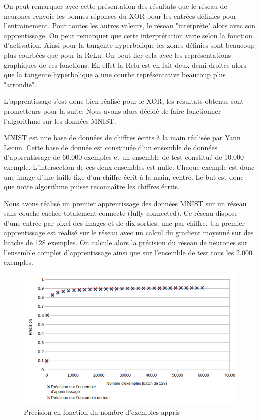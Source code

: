 \documentclass{report}
\theoremstyle{plain}
\theoremstyle{definition}
\theoremstyle{remark}
\begin{document}
On peut remarquer avec cette présentation des résultats que le réseau de neurones renvoie les bonnes réponses du XOR pour les entrées définies pour l'entrainement. Pour toutes les autres valeurs,  le réseau "interprète" alors avec son apprentissage. On peut remarquer que cette interprétation varie selon la fonction d'activation. Ainsi pour la tangente hyperbolique les zones définies sont beaucoup plus courbées que pour la ReLu. On peut lier cela avec les représentations graphiques de ces fonctions. En effet la Relu est en fait deux demi-droites alors que la tangente hyperbolique a une courbe représentative beaucoup plus "arrondie".

L'apprentissage s'est donc bien réalisé pour le XOR, les résultats obtenus sont prometteurs pour la suite. Nous avons alors décidé de faire fonctionner l'algorithme sur les données MNIST.

MNIST est une base de données de chiffres écrits à la main réalisée par Yann Lecun. Cette base de donnée est constituée d'un ensemble de données d'apprentissage de 60.000 exemples et un ensemble de test constitué de 10.000 exemple. L'intersection de ces deux ensembles est nulle. Chaque exemple est donc une image d'une taille fixe d'un chiffre écrit à la main, centré. Le but est donc que notre algorithme puisse reconnaître les chiffres écrits.

Nous avons réalisé un premier apprentissage des données MNIST sur un réseau sans couche cachée totalement connecté (fully connected). Ce réseau dispose d'une entrée par pixel des images et de dix sorties, une par chiffre. Un premier apprentissage est réalisé sur le réseau avec un calcul du gradient moyenné sur des batchs de 128 exemples. On calcule alors la précision du réseau de neurones sur l'ensemble complet d'apprentissage ainsi que sur l'ensemble de test tous les 2.000 exemples.

\begin{figure}[!h]
\begin{center}
\includegraphics[scale=0.5]{images/mnist_apprentissage_128.png}
\caption{Précision en fonction du nombre d'exemples appris}
\label{mnist_apprentissage_128}
\end{center}
\end{figure}
\end{document}
